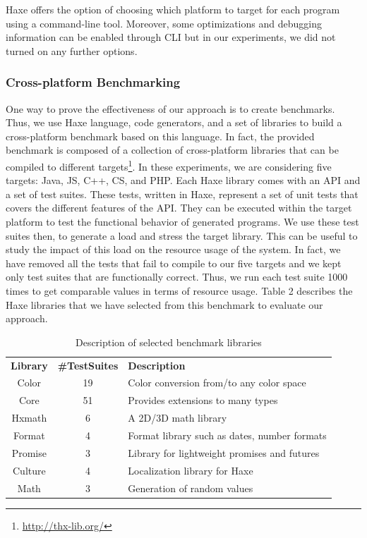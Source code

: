Haxe offers the option of choosing which platform to target for each program using a command-line tool. Moreover, some optimizations and debugging information can be enabled through CLI but in our experiments, we did not turned on any further options. 

\subsubsection{Cross-platform Benchmarking}
One way to prove the effectiveness of our approach is to create benchmarks. Thus, we use Haxe language, code generators, and a set of libraries to build a cross-platform benchmark based on this language. In fact, the provided benchmark is composed of a collection of cross-platform libraries that can be compiled to different targets\footnote{\url{http://thx-lib.org/}}. In these experiments, we are considering  five targets: Java, JS, C++, CS, and PHP. 
Each Haxe library comes with an API and a set of test suites. These tests, written in Haxe, represent a set of unit tests that covers the different features of the API. They can be executed within the target platform to test the functional behavior of generated programs. We use these test suites then, to generate a load and stress the target library. This can be useful to study the impact of this load on the resource usage of the system. In fact, we have removed all the tests that fail to compile to our five targets and we kept only test suites that are functionally correct. Thus, we run each test suite 1000 times to get comparable values in terms of resource usage.
Table 2 describes the Haxe libraries that we have selected from this benchmark to evaluate our
approach.

\begin{table}[h]
	\centering

	\begin{tabular}{|c|c|p{4.3cm}|}
		\hline
		\textbf{Library} & \textbf{\#TestSuites} & \textbf{Description} \\
		\hhline{|=|=|=|}
		Color  &  19 &  Color conversion from/to any color space   \\ \hline
		Core & 51  & Provides extensions to many types  \\ \hline
		Hxmath & 6  & A 2D/3D math library  \\ \hline
	    Format  &  4 & Format library such as dates, number formats   \\ \hline
		Promise & 3  & Library for lightweight promises and futures  \\ \hline
		Culture & 4  & Localization library for Haxe \\ \hline
		Math & 3  & Generation of random values \\ \hline
	\end{tabular}
		\caption{Description of selected benchmark libraries}
		\label{my-label}
\end{table}

